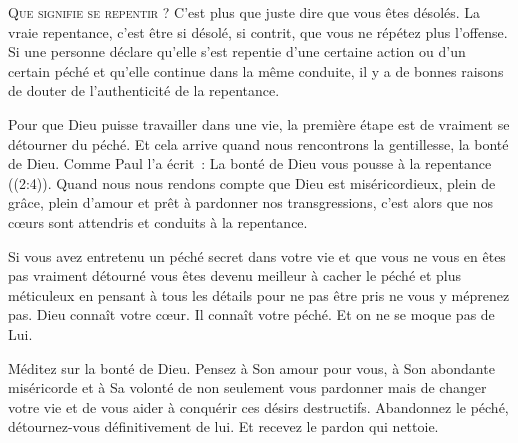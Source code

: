 

\lettrine{Q}{ue signifie \og se repentir \fg{} ?}
 C'est plus que juste dire que vous êtes désolés. La vraie repentance,
 c'est être si désolé, si contrit, que vous ne répétez plus l'offense.
 Si une personne déclare qu'elle s'est repentie d'une certaine action
 ou d'un certain péché et qu'elle continue dans la même conduite,
 il y a de bonnes raisons de douter de l'authenticité de la repentance. 

Pour que Dieu puisse travailler dans une vie, la première étape
 est de vraiment se détourner du péché. Et cela arrive quand nous rencontrons
 la gentillesse, la bonté de Dieu. Comme Paul l'a écrit~: 
 \og La bonté de Dieu vous pousse à la repentance \fg{} ((2:4)).
 Quand nous nous rendons compte que Dieu est miséricordieux, plein de grâce,
 plein d'amour et prêt à pardonner nos transgressions, c'est alors
 que nos cœurs sont attendris et conduits à la repentance. 


Si vous avez entretenu un péché secret dans votre vie et que vous ne vous
 en êtes pas vraiment détourné \ocadr vous êtes devenu meilleur à cacher
 le péché et plus méticuleux en pensant à tous les détails
 pour ne pas être pris \fcadr{} ne vous y méprenez pas.
 Dieu connaît votre cœur. Il connaît votre péché. Et on ne se moque pas de Lui. 

Méditez sur la bonté de Dieu. Pensez à Son amour pour vous,
 à Son abondante miséricorde et à Sa volonté de non seulement
 vous pardonner mais de changer votre vie et de vous aider à conquérir
 ces désirs destructifs. Abandonnez le péché, détournez-vous définitivement
 de lui. Et recevez le pardon qui nettoie. 

\dvrule






